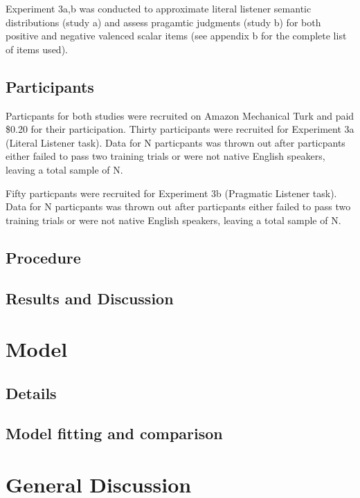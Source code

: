 \documentclass[10pt, letterpaper]{article}
\begin{document}
Experiment 3a,b was conducted to approximate literal listener semantic
distributions (study a) and assess pragamtic judgments (study b) for
both positive and negative valenced scalar items (see appendix b for the
complete list of items used).

\subsection{Participants}\label{participants-2}

Particpants for both studies were recruited on Amazon Mechanical Turk
and paid \$0.20 for their participation. Thirty participants were
recruited for Experiment 3a (Literal Listener task). Data for N
particpants was thrown out after particpants either failed to pass two
training trials or were not native English speakers, leaving a total
sample of N.

Fifty particpants were recruited for Experiment 3b (Pragmatic Listener
task). Data for N particpants was thrown out after particpants either
failed to pass two training trials or were not native English speakers,
leaving a total sample of N.

\subsection{Procedure}\label{procedure-2}

\subsection{Results and Discussion}\label{results-and-discussion-2}

\section{Model}\label{model}

\subsection{Details}\label{details}

\subsection{Model fitting and
comparison}\label{model-fitting-and-comparison}

\section{General Discussion}\label{general-discussion}
\end{document}
